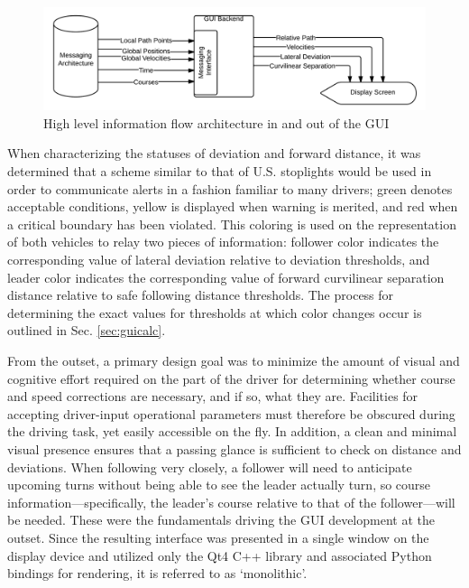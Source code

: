 \begin{figure}[ht] \centering 
    \includegraphics[width=5in]{./figs/blackbox_flowchart.png}
    \caption{High level information flow architecture in and out of the GUI} \label{fig:blackboxflow}
\end{figure}

When characterizing the statuses of deviation and forward distance, it was determined that a scheme similar to that of U.S. stoplights would be used in order to communicate alerts in a fashion familiar to many drivers; green denotes acceptable conditions, yellow is displayed when warning is merited, and red when a critical boundary has been violated. This coloring is used on the representation of both vehicles to relay two pieces of information: follower color indicates the corresponding value of lateral deviation relative to deviation thresholds, and leader color indicates the corresponding value of forward curvilinear separation distance relative to safe following distance thresholds. The process for determining the exact values for thresholds at which color changes occur is outlined in Sec. \ref{sec:guicalc}.

From the outset, a primary design goal was to minimize the amount of visual and cognitive effort required on the part of the driver for determining whether course and speed corrections are necessary, and if so, what they are. Facilities for accepting driver-input operational parameters must therefore be obscured during the driving task, yet easily accessible on the fly. In addition, a clean and minimal visual presence ensures that a passing glance is sufficient to check on distance and deviations. When following very closely, a follower will need to anticipate upcoming turns without being able to see the leader actually turn, so course information---specifically, the leader's course relative to that of the follower---will be needed.  These were the fundamentals driving the GUI development at the outset. Since the resulting interface was presented in a single window on the display device and utilized only the Qt4 C++ library and associated Python bindings for rendering, it is referred to as `monolithic'.

